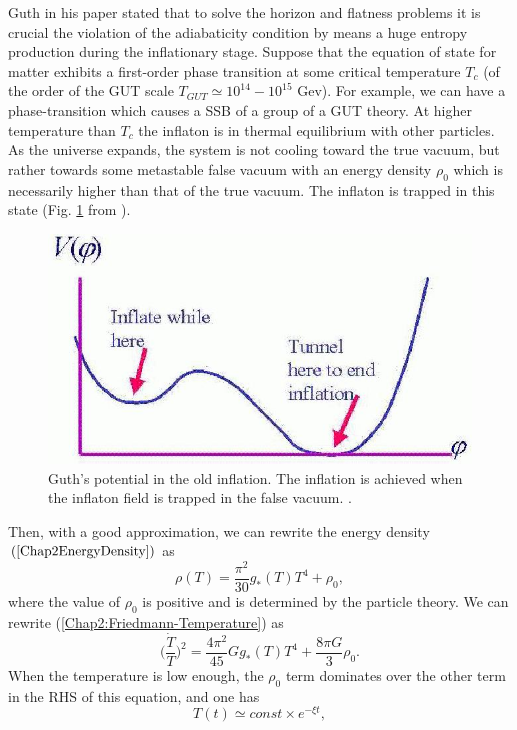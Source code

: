 \documentclass[11pt,a4paper,twoside]{book}
\begin{document}
Guth in his paper stated that to solve the horizon and flatness problems it is crucial the violation of the adiabaticity condition by means a huge entropy production during the inflationary stage.
Suppose that the equation of state for matter exhibits a first-order phase transition at some critical temperature $ T_{c} $ (of the order of the GUT scale $T_{GUT}\simeq 10^{14}-10^{15}$ Gev). For example, we can have a phase-transition which causes a SSB of a group of a GUT theory. At higher temperature than $ T_{c} $ the inflaton is in thermal equilibrium with other particles.
As the universe expands, the system is not cooling toward the true vacuum, but rather towards some metastable false vacuum with an energy density $ \rho_{0} $ which is necessarily higher than that of the true vacuum. The inflaton is trapped in this state (Fig. \ref{fig:guthinflationfig5} from \cite{Chap2:Fig1}).
\begin{figure}
	\centering
	\includegraphics[width=0.5\linewidth, height=0.24\textheight]{Images/Chap2/GuthInflation_Fig5}
	\caption{Guth's potential in the old inflation. The inflation is achieved when the inflaton field is trapped in the false vacuum.  \cite{Chap2:Fig1}. }
	\label{fig:guthinflationfig5}
\end{figure}
Then, with a good approximation, we can rewrite the energy density $ (\ref{Chap2EnergyDensity}) $ as 
\begin{equation}
	\label{Chap2:NewEnergyDensity}
	\rho(T)=\frac{\pi^{2}}{30}g_{*}(T)T^{4} + \rho_{0},
\end{equation}
where the value of $ \rho_{0} $ is positive and is determined by the particle theory.
We can rewrite (\ref{Chap2:Friedmann-Temperature}) as
\begin{equation}
\label{Chap2:Temperature-EnergydensityModified}
\Big(\frac{\dot{T}}{T}\Big)^{2}=\frac{4\pi^{2}}{45}Gg_{*}(T)T^{4}+\frac{8\pi G}{3}\rho_{0}.
\end{equation}
When the temperature is low enough, the $ \rho_{0} $ term dominates over the other term in the RHS of this equation, and one has
\begin{equation}
	T(t)\simeq const \times e^{-\xi t},
\end{equation} 
\end{document}
